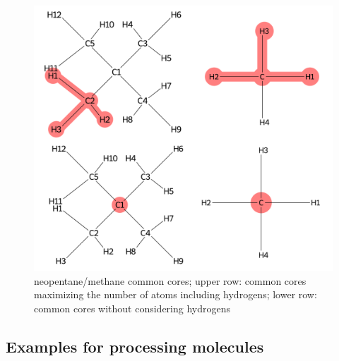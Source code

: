 \begin{figure}
	\includegraphics[scale=0.55]{neopentan_new}
	
	\caption{neopentane/methane common cores; upper row: common cores maximizing the number of atoms including hydrogens; lower row: common cores without considering hydrogens }
		\label{fig:neopentan}
\end{figure}



\subsection{Examples for processing molecules}

